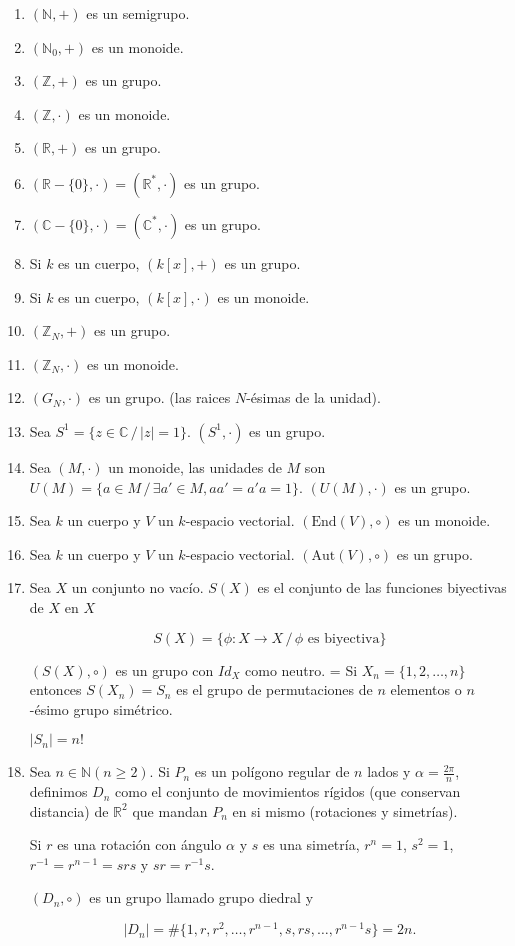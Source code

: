 \begin{enumerate}
\item $(\mathbb{N},+)$ es un semigrupo.
\item $(\mathbb{N}_0,+)$ es un monoide.
\item $(\mathbb{Z},+)$ es un grupo.
\item $(\mathbb{Z},\cdot)$ es un monoide.
\item $(\mathbb{R},+)$ es un grupo.
\item $(\mathbb{R} - \{0\},\cdot) = (\mathbb{R}^{*},\cdot)$ es un grupo.
\item $(\mathbb{C} - \{0\},\cdot) = (\mathbb{C}^{*},\cdot)$ es un grupo.
\item Si $k$ es un cuerpo, $(k[x],+)$ es un grupo.
\item Si $k$ es un cuerpo, $(k[x],\cdot)$ es un monoide.
\item $(\mathbb{Z}_N, +)$ es un grupo.
\item $(\mathbb{Z}_N,\cdot)$ es un monoide.
\item $(G_N,\cdot)$ es un grupo. (las raices $N$-\'esimas de la unidad).
\item Sea $S^1 = \{z \in \mathbb{C} \, / \, |z| = 1\}$. $(S^1,\cdot)$ es un grupo.
\item Sea $(M,\cdot)$ un monoide, las unidades de $M$ son $U(M) = \{a \in M \, / \, \exists a' \in M, aa' = a'a = 1\}$. $(U(M),\cdot)$ es un grupo.
\item Sea $k$ un cuerpo y $V$ un $k$-espacio vectorial. $(\textrm{End}(V),\circ)$ es un monoide.
\item Sea $k$ un cuerpo y $V$ un $k$-espacio vectorial. $(\textrm{Aut}(V),\circ)$ es un grupo.
\item Sea $X$ un conjunto no vac\'io. $S(X)$ es el conjunto de las funciones biyectivas de $X$ en $X$

$$S(X) = \{\phi : X \rightarrow X \, / \, \phi \textrm{ es biyectiva}\}$$

$(S(X),\circ)$ es un grupo con $Id_X$ como neutro.
=
Si $X_n = \{1,2,\dots,n\}$ entonces $S(X_n) = S_n$ es el grupo de permutaciones de $n$ elementos o $n$-\'esimo grupo sim\'etrico.

$|S_n| = n!$

\item Sea $n \in \mathbb{N} (n \geq 2)$. Si $P_n$ es un pol\'igono regular de $n$ lados y $\alpha = \frac{2\pi}{n}$, definimos $D_n$ como el conjunto de movimientos r\'igidos (que conservan distancia) de $\mathbb{R}^2$ que mandan $P_n$ en si mismo (rotaciones y simetr\'ias).

Si $r$ es una rotaci\'on con \'angulo $\alpha$ y $s$ es una simetr\'ia, $r^n = 1$, $s^2 = 1$, $r^{-1} = r^{n-1} = srs$ y $sr = r^{-1}s$.

$(D_n,\circ)$ es un grupo llamado grupo diedral y 

$$|D_n| = \#\{1,r,r^2,\dots,r^{n-1},s,rs,\dots,r^{n-1}s\} = 2n.$$
\end{enumerate}

